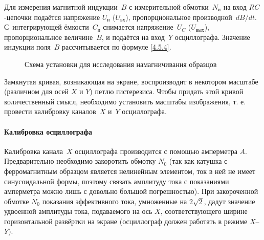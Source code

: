 Для измерения магнитной индукции~$B$ с измерительной обмотки~$N_{и}$ на
вход $RC$-цепочки подаётся напряжение $U_{и}$ ($U_{вх}$),
пропорциональное производной~$dB/dt$.
С~интегрирующей ёмкости~$C_{и}$ снимается напряжение~$U_C$ ($U_{вых}$),
пропорциональное величине~$B$, и подаётся на вход~$Y$ осциллографа.
Значение индукции поля~$B$ рассчитывается по формуле
\eqref{4.5.4}.

\begin{figure}[h!]
\centering
	\caption{Схема установки для исследования намагничивания образцов}
\end{figure}

Замкнутая кривая, возникающая на экране, воспроизводит в некотором масштабе
(различном для осей $X$ и $Y$) петлю гистерезиса. Чтобы придать этой кривой
количественный смысл, необходимо установить масштабы изображения, т. е. провести
калибровку каналов~$X$ и~$Y$ осциллографа.
%





\paragraph{Калибровка осциллографа}
Калибровка канала~$X$ осциллографа производится с помощью амперметра $A$.
Предварительно необходимо закоротить обмотку $N_0$
(так как катушка с ферромагнитным образцом является
нелинейным элементом, ток в ней не имеет синусоидальной формы,
поэтому связать амплитуду тока с показаниями амперметра можно лишь
с довольно большой погрешностью). При закороченной обмотке $N_0$
показания эффективного тока, умноженные на $2\sqrt{2}$,
дадут значение удвоенной амплитуды тока, подаваемого на ось $X$,
соответствующего ширине горизонтальной развёртки на экране
(осциллограф должен работать в режиме $X$--$Y$).

